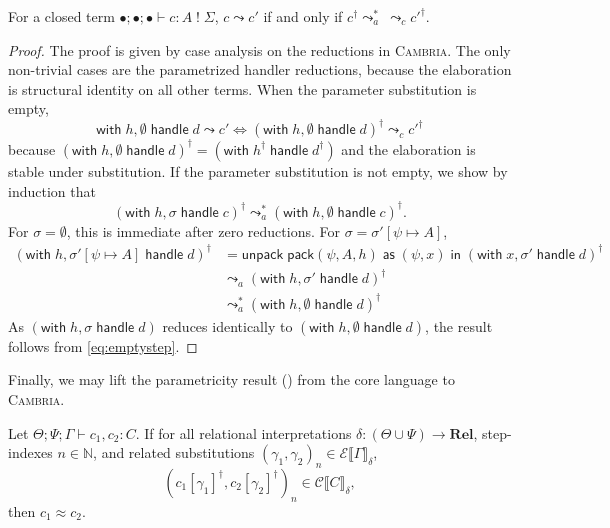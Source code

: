 \documentclass[acmsmall,screen,review,anonymous]{acmart}
\newcommand{\cambria}{\textsc{Cambria}}
\newcommand{\comp}[2]{#1\;!\;#2}
\newcommand{\iin}{\;\mathsf{in}\;}
\newcommand{\with}{\mathsf{with}\;}
\newcommand{\handle}{\;\mathsf{handle}\;}
\newcommand{\pack}{\mathsf{pack}}
\newcommand{\unpack}{\mathsf{unpack}\;}
\newcommand{\as}{\;\mathsf{as}\;}
\newcommand{\Sig}{\Sigma}
\newcommand{\cj}[6]{#1; #2; #3 \vdash #4 : \comp{#5}{#6}}
\newcommand{\cjp}[5]{#1; #2; #3 \vdash #4 : #5}
\newcommand{\eenv}{\bullet}
\newcommand{\Rel}{\mathbf{Rel}}
\newcommand{\CC}{\mathcal{C}}
\newcommand{\GG}{\mathcal{E}}
\begin{document}
\begin{proposition} \label{prop:op-corresp}
  For a closed term $\cj \eenv \eenv \eenv c A \Sig$, $c \leadsto c'$ if and only if $c^\dagger \leadsto_a^* \ \leadsto_c {c'}^\dagger$.
\end{proposition}

\begin{proof}
  The proof is given by case analysis on the reductions in \cambria{}.
  The only non-trivial cases are the parametrized handler reductions,
  because the elaboration is structural identity on all other terms.
  When the parameter substitution is empty,
  \begin{equation}
    \with h, \emptyset \handle d \leadsto c' \iff (\with h, \emptyset \handle d)^\dagger \leadsto_c c'^\dagger \label{eq:emptystep}
  \end{equation}
  because $(\with h, \emptyset \handle d)^\dagger = (\with h^\dagger \handle d^\dagger)$ and the elaboration is stable under substitution.
  If the parameter substitution is not empty, we show by induction that
  \[
    (\with h, \sigma \handle c)^\dagger \leadsto^*_a (\with h, \emptyset \handle c)^\dagger.
  \]
  For $\sigma = \emptyset$, this is immediate after zero reductions.
  For $\sigma = \sigma'[\psi \mapsto A]$,
  \begin{align*}
    (\with h, \sigma'[\psi \mapsto A] \handle d)^\dagger
    &= \unpack \pack(\psi, A, h) \as (\psi, x) \iin (\with x, \sigma' \handle d)^\dagger \\
    &\leadsto_a (\with h, \sigma' \handle d)^\dagger \\
    &\leadsto_a^* (\with h, \emptyset \handle d)^\dagger \tag{IH}
  \end{align*}
  As $(\with h, \sigma \handle d)$ reduces identically to $(\with h, \emptyset \handle d)$, the result follows from \eqref{eq:emptystep}.
\end{proof}

Finally, we may lift the parametricity result () from the core language to \cambria{}.

\begin{theorem}[Adequacy]
  Let $\cjp \Theta \Psi \Gamma {c_1, c_2} C$. If for all relational interpretations $\delta: (\Theta \cup \Psi) \to \Rel$,
  step-indexes $n\in\mathbb{N}$, and related substitutions $(\gamma_1, \gamma_2)_n \in \GG\llbracket \Gamma \rrbracket_\delta$,
  \[
    (c_1[\gamma_1]^\dagger, c_2[\gamma_2]^\dagger)_n \in \CC\llbracket C \rrbracket_\delta,
  \]
  then $c_1 \approx c_2$.
\end{theorem}
\end{document}
